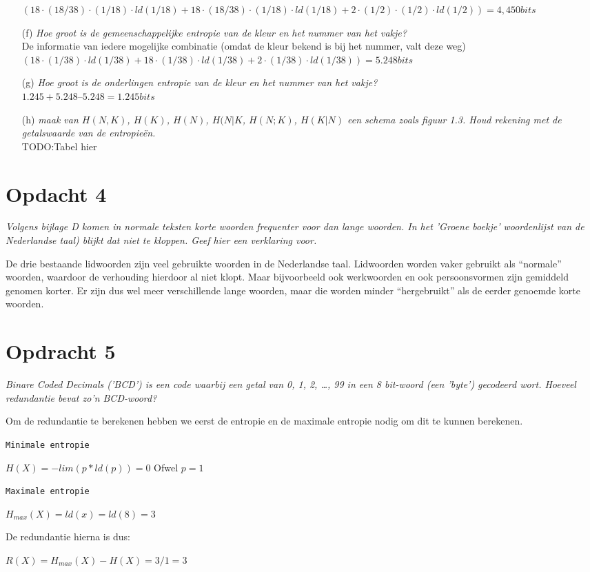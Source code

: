 \begin{itemize}
     $(18 \cdot (18/38) \cdot (1/18) \cdot ld(1/18) + 18 \cdot (18/38) \cdot (1/18) \cdot ld(1/18) + 2 \cdot (1/2) \cdot (1/2) \cdot ld(1/2)) = 4,450 bits$    

  \item[(f)] \emph{Hoe groot is de gemeenschappelijke entropie van de kleur en het nummer van het vakje?}\\
    
    De informatie van iedere mogelijke combinatie (omdat de kleur bekend is bij het nummer, valt deze weg)\\
    $(18 \cdot (1/38) \cdot ld(1/38) + 18 \cdot (1/38) \cdot ld(1/38) + 2 \cdot (1/38) \cdot ld(1/38)) = 5.248 bits$

  \item[(g)] \emph{Hoe groot is de onderlingen entropie van de kleur en het nummer van het vakje?}\\
    $1.245 + 5.248 – 5.248 = 1.245 bits$

  \item[(h)] \emph{maak van $H(N,K)$, $H(K)$, $H(N)$, $H(N|K$, $H(N;K)$, $H(K|N)$ een schema zoals figuur 1.3. Houd rekening met de getalswaarde van de entropie\"{e}n.}\\
    
    TODO:Tabel hier
    
\end{itemize}


\section{Opdacht 4}
\emph{Volgens bijlage D komen in normale teksten korte woorden frequenter voor dan lange woorden. In het 'Groene boekje' woordenlijst van de Nederlandse taal) blijkt dat niet te kloppen.  Geef hier een verklaring voor.}

De drie bestaande lidwoorden zijn veel gebruikte woorden in de Nederlandse taal. Lidwoorden worden vaker gebruikt als ``normale'' woorden, waardoor de verhouding hierdoor al niet klopt. Maar bijvoorbeeld ook werkwoorden en ook persoonsvormen zijn gemiddeld genomen korter. Er zijn dus wel meer verschillende lange woorden, maar die worden minder ``hergebruikt'' als de eerder genoemde korte woorden. 

\section{Opdracht 5}
\emph{Binare Coded Decimals ('BCD') is een code waarbij een getal van 0, 1, 2, \ldots, 99 in een 8 bit-woord (een '\emph{byte}') gecodeerd wort. Hoeveel redundantie bevat zo'n BCD-woord?}

Om de redundantie te berekenen hebben we eerst de entropie en de maximale entropie nodig om dit te kunnen berekenen.

\texttt{Minimale entropie}

$H(X)=-lim(p*ld(p))=0$
Ofwel
$p=1$

\texttt{Maximale entropie}

$H_{max}(X)=ld(x)=ld(8)=3$

De redundantie hierna is dus:

$R(X)=H_{max}(X)-H(X)=3/1=3$
